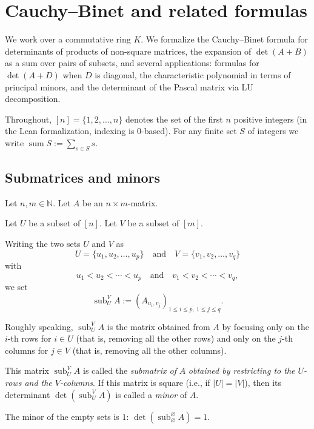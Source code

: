\section{Cauchy--Binet and related formulas}

We work over a commutative ring $K$. We formalize the Cauchy--Binet formula
for determinants of products of non-square matrices, the expansion of
$\det(A+B)$ as a sum over pairs of subsets, and several applications:
formulas for $\det(A+D)$ when $D$ is diagonal, the characteristic
polynomial in terms of principal minors, and the determinant of the Pascal
matrix via LU decomposition.

Throughout, $[n] = \{1,2,\ldots,n\}$ denotes the set of the first $n$
positive integers (in the Lean formalization, indexing is $0$-based).
For any finite set $S$ of integers we write
$\operatorname{sum} S := \sum_{s \in S} s$.

\subsection{Submatrices and minors}

\begin{definition}
\label{def.det.sub}
\leantarget
\leanok
Let $n,m\in\mathbb{N}$. Let $A$ be an $n\times m$-matrix.

Let $U$ be a subset of $[n]$. Let $V$ be a subset of $[m]$.

Writing the two sets $U$ and $V$ as
\[
U=\{u_1,u_2,\ldots,u_p\}
\quad\text{and}\quad
V=\{v_1,v_2,\ldots,v_q\}
\]
with
\[
u_1<u_2<\cdots<u_p
\quad\text{and}\quad
v_1<v_2<\cdots<v_q,
\]
we set
\[
\operatorname{sub}_U^V A:=\left(A_{u_i,v_j}\right)_{1\le i\le p,\ 1\le j\le q}.
\]

Roughly speaking, $\operatorname{sub}_U^V A$ is the matrix obtained from
$A$ by focusing only on the $i$-th rows for $i\in U$ (that is,
removing all the other rows) and only on the $j$-th columns for
$j\in V$ (that is, removing all the other columns).

This matrix $\operatorname{sub}_U^V A$ is called the \emph{submatrix of}
$A$ \emph{obtained by restricting to the $U$-rows
and the $V$-columns}. If this matrix is square (i.e., if $|U|=|V|$), then its determinant
$\det(\operatorname{sub}_U^V A)$ is called a \emph{minor} of
$A$.
\end{definition}

\begin{lemma}
\label{lem.minor.empty}
\leanhelper
\leanok
The minor of the empty sets is $1$:
$\det(\operatorname{sub}_{\varnothing}^{\varnothing} A) = 1$.
\end{lemma}

